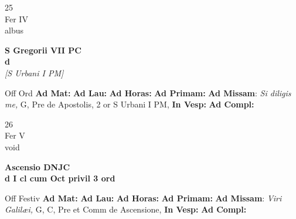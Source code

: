 \documentclass[10pt, openany]{book}
\begin{document}
    \begin{center}
        \begin{minipage}{3.5in}
            \vspace{2em}
            \begin{minipage}{0.5in}
                {\Huge 25} \\
                {\normalsize Fer IV} \\
                {\normalsize albus}
            \end{minipage}
            \begin{minipage}{3.0in}
                \textbf{ \large S Gregorii VII PC \\
                \textnormal{\normalsize d}} \\ \textit{[S Urbani I PM]} \\ 
            \end{minipage}
            \begin{justify}Off Ord
                \textbf{Ad Mat: }
                \textbf{Ad Lau: }
                \textbf{Ad Horas: }
                \textbf{Ad Primam: }\textbf{Ad Missam}: \textit{Si diligis me,} G, Pre de Apostolis, 2 or S Urbani I PM,  
                \textbf{In Vesp: }
                \textbf{Ad Compl: }
            \end{justify}
        \end{minipage}
    \end{center}

    \begin{center}
        \begin{minipage}{3.5in}
            \vspace{2em}
            \begin{minipage}{0.5in}
                {\Huge 26} \\
                {\normalsize Fer V} \\
                {\normalsize void}
            \end{minipage}
            \begin{minipage}{3.0in}
                \textbf{ \large Ascensio DNJC \\
                \textnormal{\normalsize d I cl cum Oct privil 3 ord}} \\ 
            \end{minipage}
            \begin{justify}Off Festiv
                \textbf{Ad Mat: }
                \textbf{Ad Lau: }
                \textbf{Ad Horas: }
                \textbf{Ad Primam: }\textbf{Ad Missam}: \textit{Viri Galilæi,} G, C, Pre et Comm de Ascensione,  
                \textbf{In Vesp: }
                \textbf{Ad Compl: }
            \end{justify}
        \end{minipage}
    \end{center}
\end{document}
